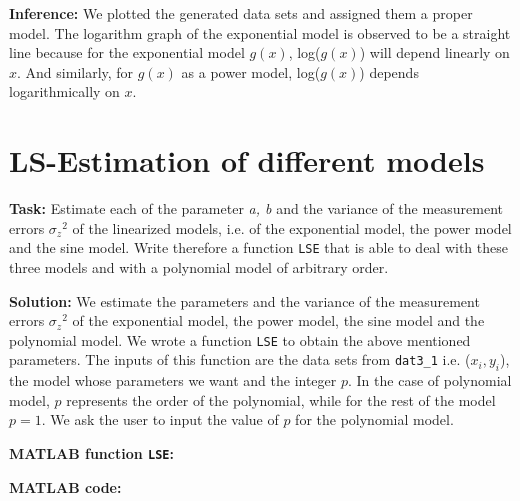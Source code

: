 \noindent \textbf{Inference:} We plotted the generated data sets and assigned them a proper model. The logarithm graph of the exponential model is observed to be a straight line because for the exponential model $g(x)$, log($g(x)$) will depend linearly on $x.$ And similarly, for $g(x)$ as a power model, log($g(x)$)  depends logarithmically on $x.$


\section{ LS-Estimation of different models  } \label{ LS-Estimation of different models }
\noindent \textbf{Task:} Estimate each of the parameter \textit{a, b} and the variance of the measurement errors ${\sigma_z}^2$ of the linearized models, i.e. of the exponential model, the power model and the sine model. Write therefore a function \texttt{LSE} that is able to deal with these three models and with a polynomial model of arbitrary order.

\noindent \textbf{Solution:} We estimate the parameters and the variance of the measurement errors ${\sigma_z}^2$ of the exponential model, the power model, the sine model and the polynomial model. We wrote a function \texttt{LSE} to obtain the above mentioned parameters. The inputs of this function are the data sets from \texttt{dat3\_1} i.e. ($x_i, y_i$), the model whose parameters we want and the integer $p.$ In the case of polynomial model, $p$ represents the order of the polynomial, while for the rest of the model $p = 1.$ We ask the user to input the value of $p$ for the polynomial model.

\noindent \textbf{MATLAB function \texttt{LSE}:}


\noindent \textbf{MATLAB code:}


